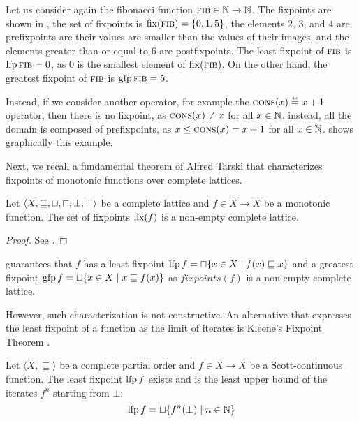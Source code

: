 \begin{example}
  Let us consider again the fibonacci function $\textsc{fib} \in \mathbb{N} \to \mathbb{N}$. The fixpoints are shown in , the set of fixpoints is $\textup{fix}(\textsc{fib}) = \{0, 1, 5\}$, the elements $2$, $3$, and $4$ are prefixpoints are their values are smaller than the values of their images, and the elements greater than or equal to $6$ are postfixpoints.
  The least fixpoint of $\textsc{fib}$ is $\operatorname{lfp} \textsc{fib} = 0$, as $0$ is the smallest element of $\textup{fix}(\textsc{fib})$.
  On the other hand, the greatest fixpoint of $\textsc{fib}$ is $\operatorname{gfp} \textsc{fib} = 5$.

  Instead, if we consider another operator, for example the $\textsc{cons}(x) \defeq x + 1$ operator, then there is no fixpoint, as $\textsc{cons}(x) \neq x$ for all $x \in \mathbb{N}$. instead, all the domain is composed of prefixpoints, as $x \le \textsc{cons}(x) = x + 1$ for all $x \in \mathbb{N}$.  shows graphically this example.
\end{example}

Next, we recall a fundamental theorem of Alfred Tarski  that characterizes fixpoints of monotonic functions over complete lattices.

\begin{theorem}
  Let $\langle X, \sqsubseteq, \sqcup, \sqcap, \bot, \top \rangle$ be a complete lattice and $f \in X \to X$ be a monotonic function. The set of fixpoints $\textup{fix}(f)$ is a non-empty complete lattice.
\end{theorem}
\begin{proof}
  See \textcite{Tarski1955}.
\end{proof}
 guarantees that $f$ has a least fixpoint $\operatorname{lfp} f = \sqcap \{x \in X \mid f(x) \sqsubseteq x\}$ and a greatest fixpoint $\operatorname{gfp} f = \sqcup \{x \in X \mid x \sqsubseteq f(x)\}$ as $fixpoints(f)$ is a non-empty complete lattice.

However, such characterization is not constructive. An alternative that expresses the least fixpoint of a function as the limit of iterates is Kleene's Fixpoint Theorem .


\begin{theorem}
  Let $\langle X, \sqsubseteq \rangle$ be a complete partial order and $f \in X \to X$ be a Scott-continuous function. The least fixpoint $\operatorname{lfp} f$ exists and is the least upper bound of the iterates $f^n$ starting from $\bot$:
  \[ \operatorname{lfp} f = \sqcup \{f^n(\bot) \mid n \in \mathbb{N}\} \]
\end{theorem}

